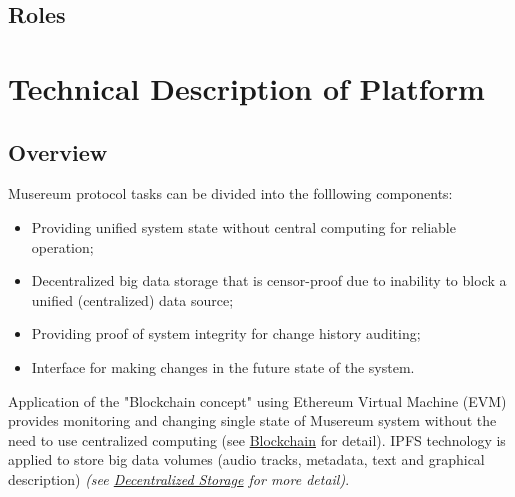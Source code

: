 \documentclass[12pt]{report}
\begin{document}
\section{Roles}
\label{platform-roles}


\chapter{Technical Description of Platform}
\section{Overview}
\label{tech-review}
\begin{multicols}{2}
Musereum protocol tasks can be divided into the folllowing components:
\begin{itemize}
\item Providing unified system state without central computing for reliable operation;
\item Decentralized big data storage that is censor-proof due to inability to block a unified (centralized) data source;
\item Providing proof of system integrity for change history auditing;
\item Interface for making changes in the future state of the system.
\end{itemize}
\vfill\null
\columnbreak
Application of the "Blockchain concept" using Ethereum Virtual Machine (EVM) provides monitoring and changing single state of Musereum system without the need to use centralized computing (see \hyperref[tech-blockchain]{Blockchain} for detail). IPFS technology is applied to store big data volumes (audio tracks, metadata, text and graphical description) \textit{(see \hyperref[tech-storage]{Decentralized Storage} for more detail)}.

\end{multicols}
\pagebreak
\end{document}
